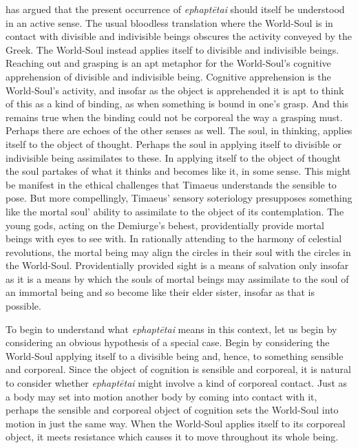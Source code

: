 \citet[]{Betegh:2019fq} has argued that the present occurrence of \emph{ephaptētai} should itself be understood in an active sense. The usual bloodless translation where the World-Soul is in contact with divisible and indivisible beings obscures the activity conveyed by the Greek. The World-Soul instead applies itself to divisible and indivisible beings. Reaching out and grasping is an apt metaphor for the World-Soul's cognitive apprehension of divisible and indivisible being. Cognitive apprehension is the World-Soul's activity, and insofar as the object is apprehended it is apt to think of this as a kind of binding, as when something is bound in one's grasp. And this remains true when the binding could not be corporeal the way a grasping must. Perhaps there are echoes of the other senses as well. The soul, in thinking, applies itself to the object of thought. Perhaps the soul in applying itself to divisible or indivisible being assimilates to these. In applying itself to the object of thought the soul partakes of what it thinks and becomes like it, in some sense. This might be manifest in the ethical challenges that Timaeus understands the sensible to pose. But more compellingly, Timaeus' sensory soteriology presupposes something like the mortal soul' ability to assimilate to the object of its contemplation. The young gods, acting on the Demiurge's behest, providentially provide mortal beings with eyes to see with. In rationally attending to the harmony of celestial revolutions, the mortal being may align the circles in their soul with the circles in the World-Soul. Providentially provided sight is a means of salvation only insofar as it is a means by which the souls of mortal beings may assimilate to the soul of an immortal being and so become like their elder sister, insofar as that is possible.

To begin to understand what \emph{ephaptētai} means in this context, let us begin by considering an obvious hypothesis of a special case. Begin by considering the World-Soul applying itself to a divisible being and, hence, to something sensible and corporeal. Since the object of cognition is sensible and corporeal, it is natural to consider whether \emph{ephaptētai} might involve a kind of corporeal contact. Just as a body may set into motion another body by coming into contact with it, perhaps the sensible and corporeal object of cognition sets the World-Soul into motion in just the same way. When the World-Soul applies itself to its corporeal object, it meets resistance which causes it to move throughout its whole being. 

